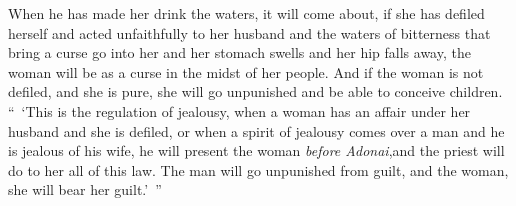 \begin{biblechapter}
\verse When he has made her drink the waters, it will come about, if she has defiled herself and acted unfaithfully to her husband and the waters of bitterness that bring a curse go into her and her stomach swells and her hip falls away, the woman will be as a curse in the midst of her people.
\verse And if the woman is not defiled, and she is pure, she will go unpunished and be able to conceive children.
\verse “ ‘This is the regulation of jealousy, when a woman has an affair under her husband and she is defiled,
\verse or when a spirit of jealousy comes over a man and he is jealous of his wife, he will present the woman \textit{before Adonai},and the priest will do to her all of this law.
\verse The man will go unpunished from guilt, and the woman, she will bear her guilt.’ ”
\end{biblechapter}

